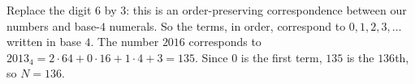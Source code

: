 Replace the digit $6$ by $3$: this is an order-preserving correspondence between our numbers and base-$4$ numerals. So the terms, in order, correspond to $0,1,2,3,\dots$ written in base $4$. The number $2016$ corresponds to $2013_4=2\cdot64+0\cdot16+1\cdot4+3=135$. Since $0$ is the first term, $135$ is the $136$th, so $N=\boxed{136}$.
